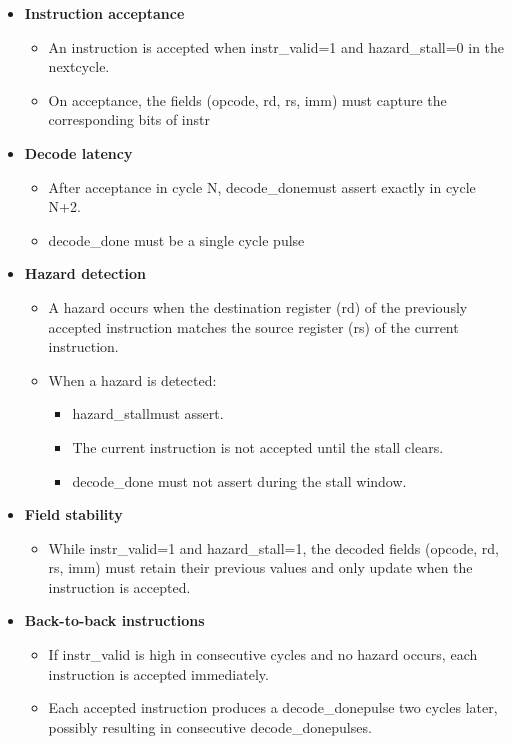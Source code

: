 \begin{itemize}
    \item \textbf{Instruction acceptance}
    \begin{itemize}
        \item An instruction is accepted when instr\_valid=1 and hazard\_stall=0 in the nextcycle.
        \item On acceptance, the fields (opcode, rd, rs, imm) must capture the corresponding bits of instr
    \end{itemize}

    \item \textbf{Decode latency}
    \begin{itemize}
        \item After acceptance in cycle N, decode\_donemust assert exactly in cycle N+2.
        \item decode\_done must be a single cycle pulse
    \end{itemize}

    \item \textbf{Hazard detection}
    \begin{itemize}
        \item A hazard occurs when the destination register (rd) of the previously accepted instruction matches the source register (rs) of the current instruction.
        \item When a hazard is detected:
        \begin{itemize}
            \item hazard\_stallmust assert.
            \item The current instruction is not accepted until the stall clears.
            \item decode\_done must not assert during the stall window.
        \end{itemize}
    \end{itemize}

    \item \textbf{Field stability}
    \begin{itemize}
        \item While instr\_valid=1 and hazard\_stall=1, the decoded fields (opcode, rd, rs, imm) must retain their previous values and only update when the instruction is accepted.
    \end{itemize}

    \item \textbf{Back-to-back instructions}
    \begin{itemize}
        \item If instr\_valid is high in consecutive cycles and no hazard occurs, each instruction is accepted immediately.
        \item Each accepted instruction produces a decode\_donepulse two cycles later, possibly resulting in consecutive decode\_donepulses.
    \end{itemize}


\end{itemize}
